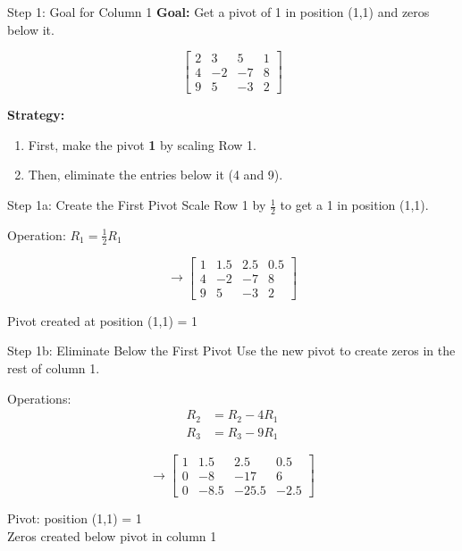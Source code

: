 \documentclass[aspectratio=169,xcolor=dvipsnames,svgnames,x11names,fleqn]{beamer}
\begin{document}
\begin{frame}{Step 1: Goal for Column 1}
\centering
\textbf{Goal:} Get a pivot of \alert{1} in position (1,1) and zeros below it.

$$
\left[\begin{array}{ccc|c}
2 & 3 & 5 & 1\\
4 & -2 & -7 & 8\\
9 & 5 & -3 & 2
\end{array}\right]
$$

\vspace{5mm}
\textbf{Strategy:}
\begin{enumerate}
    \item First, make the pivot \textbf{1} by scaling Row 1.
    \item Then, eliminate the entries below it (4 and 9).
\end{enumerate}
\end{frame}

\begin{frame}{Step 1a: Create the First Pivot}
\centering
Scale Row 1 by $\frac{1}{2}$ to get a \alert{1} in position (1,1).

\vspace{3mm}
\alert{Operation:} $R_1 = \frac{1}{2} R_1$

\vspace{3mm}
$$
\rightarrow \left[\begin{array}{ccc|c}
1 & 1.5 & 2.5 & 0.5\\
4 & -2 & -7 & 8\\
9 & 5 & -3 & 2
\end{array}\right]
$$

\vspace{3mm}
\colorbox{red!20}{Pivot created at position (1,1) = 1}
\end{frame}

\begin{frame}{Step 1b: Eliminate Below the First Pivot}
\centering
Use the new pivot to create \alert{zeros} in the rest of column 1.

\vspace{3mm}
\alert{Operations:}
\begin{align*}
R_2 &= R_2 - 4R_1 \\
R_3 &= R_3 - 9R_1
\end{align*}

\vspace{3mm}
$$
\rightarrow \left[\begin{array}{ccc|c}
1 & 1.5 & 2.5 & 0.5\\
0 & -8 & -17 & 6\\
0 & -8.5 & -25.5 & -2.5
\end{array}\right]
$$

\vspace{3mm}
\colorbox{red!20}{Pivot: position (1,1) = 1} \\
\colorbox{blue!20}{Zeros created below pivot in column 1}
\end{frame}
\end{document}
